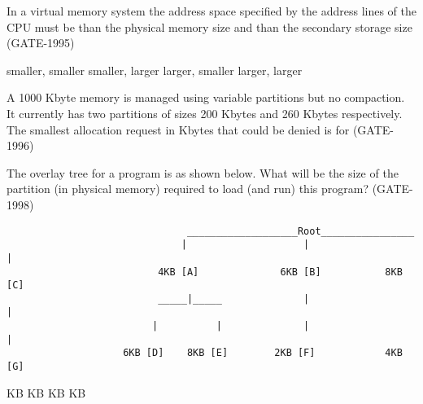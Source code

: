
\begin{questyle}

  \question  In a virtual memory system the address space specified by the address lines of the CPU must be \fillin[]
            than the physical memory size and \fillin[] than the secondary storage size (GATE-1995)

  \begin{choices}
    \choice smaller, smaller
    \choice smaller, larger
    \choice larger, smaller
    \choice larger, larger
  \end{choices}

\end{questyle}


\begin{questyle}

  \question  A 1000 Kbyte memory is managed using variable partitions but no compaction. It currently has two
            partitions of sizes 200 Kbytes and 260 Kbytes respectively. The smallest allocation request in Kbytes
            that could be denied is for (GATE-1996)

  \begin{oneparchoices}
  \end{oneparchoices}

\end{questyle}


\begin{questyle}

  \question  The overlay tree for a program is as shown below. What will be the size of the partition (in physical memory)
             required to load (and run) this program?  (GATE-1998)
             \begin{lstlisting}
                               ___________________Root________________
                              |                    |                  |
                          4KB [A]              6KB [B]           8KB [C]
                          _____|_____              |                  |
                         |          |              |                  |
                    6KB [D]    8KB [E]        2KB [F]            4KB [G]
              \end{lstlisting}
  \begin{choices}
     KB
     KB
     KB
     KB
  \end{choices}

\end{questyle}

